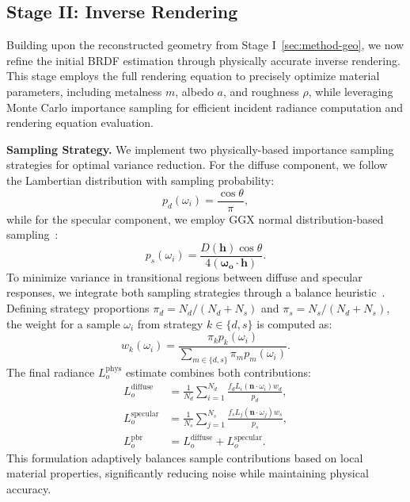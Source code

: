 \subsection{Stage II: Inverse Rendering}
\label{sec:method-ir}
Building upon the reconstructed geometry from Stage I~\ref{sec:method-geo}, we now refine the initial BRDF estimation through physically accurate inverse rendering. This stage employs the full rendering equation to precisely optimize material parameters, including metalness $m$, albedo $a$, and roughness $\rho$, while leveraging Monte Carlo importance sampling for efficient incident radiance computation and rendering equation evaluation.

\noindent\textbf{Sampling Strategy.} 
We implement two physically-based importance sampling strategies for optimal variance reduction. For the diffuse component, we follow the Lambertian distribution with sampling probability:
\begin{equation}
p_d(\omega_i) = \frac{\cos\theta}{\pi},
\end{equation}
while for the specular component, we employ GGX normal distribution-based sampling~\cite{cook1982reflectance}:
\begin{equation}
p_s(\omega_i) = \frac{D(\boldsymbol{h}) \cos\theta}{4(\boldsymbol{\omega_o} \cdot \boldsymbol{h})}.
\end{equation}
To minimize variance in transitional regions between diffuse and specular responses, we integrate both sampling strategies through a balance heuristic~\cite{veach1998robust}. Defining strategy proportions $\pi_d = N_d / (N_d + N_s)$ and $\pi_s = N_s / (N_d + N_s)$, the weight for a sample $\omega_i$ from strategy $k \in \{d, s\}$ is computed as:
\begin{equation}
w_k(\omega_i) = \frac{\pi_k p_k(\omega_i)}{\sum_{m \in \{d,s\}} \pi_m p_m(\omega_i)}.
\end{equation}
The final radiance $L_o^{\mathrm{phys}}$ estimate combines both contributions:
\begin{align}
L_o^{\mathrm{diffuse}} &= \frac{1}{N_d} \sum_{i=1}^{N_d} \frac{f_d L_i (\boldsymbol{n} \cdot \omega_i) w_d}{p_d}, \\
L_o^{\mathrm{specular}} &= \frac{1}{N_s} \sum_{j=1}^{N_s} \frac{f_s L_j (\boldsymbol{n} \cdot \omega_j) w_s}{p_s}, \\
L_o^{\mathrm{pbr}} &= L_o^{\mathrm{diffuse}} + L_o^{\mathrm{specular}}.
\end{align}
This formulation adaptively balances sample contributions based on local material properties, significantly reducing noise while maintaining physical accuracy.

